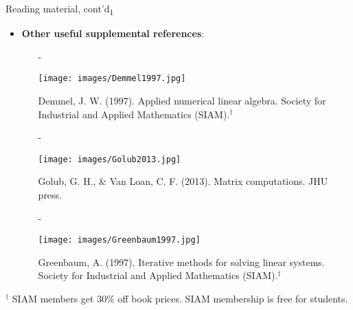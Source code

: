 \documentclass[t,usepdftitle=false]{beamer}
\begin{document}
\begin{frame}{Reading material, cont'd\textsubscript{1}}
\begin{itemize}
\item \textbf{Other useful supplemental references}:
\begin{itemize}
\item[-]\begin{minipage}{0.2\textwidth}\vspace{.3cm}
\texttt{[image: images/Demmel1997.jpg]}
\end{minipage}
\hspace{-.8cm}
\begin{minipage}{0.75\textwidth}
Demmel, J. W. (1997). Applied numerical linear algebra. 
Society for Industrial and Applied Mathematics (SIAM).${}^\dagger$
\end{minipage}\vspace{.3cm}
\item[-]\begin{minipage}{0.2\textwidth}\vspace{.3cm}
\texttt{[image: images/Golub2013.jpg]}
\end{minipage}
\hspace{-.8cm}
\begin{minipage}{0.75\textwidth}
Golub, G. H., \& Van Loan, C. F. (2013). Matrix computations. 
JHU press.
\end{minipage}\vspace{.3cm}
\item[-]\begin{minipage}{0.2\textwidth}\vspace{.3cm}
\texttt{[image: images/Greenbaum1997.jpg]}
\end{minipage}
\hspace{-.8cm}
\begin{minipage}{0.75\textwidth}
Greenbaum, A. (1997). Iterative methods for solving linear systems. 
Society for Industrial and Applied Mathematics (SIAM).${}^\dagger$
\end{minipage}\vspace{.3cm}
\end{itemize}
\end{itemize}
\vfill
\tiny{${}^\dagger$ SIAM members get 30\% off book prices. SIAM membership is free for students.}
\end{frame}
\end{document}
